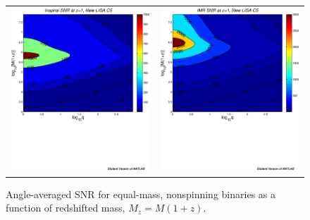 \documentclass{iopart}
\begin{document}
\begin{figure}[H]
\begin{center}
\begin{tabular}{cc}
\includegraphics[scale=0.41,clip=true]{FigEmanuele/C5InspSNRContourz1.ps}
&\includegraphics[scale=0.41,clip=true]{FigEmanuele/C5IMRSNRContourz1.ps}\\
\end{tabular}
\caption{\label{fig:SNRMiniLISA3} Angle-averaged SNR for equal-mass,
  nonspinning binaries as a function of redshifted mass, $M_z=M(1+z)$.}
\end{center}
\end{figure}
\end{document}

